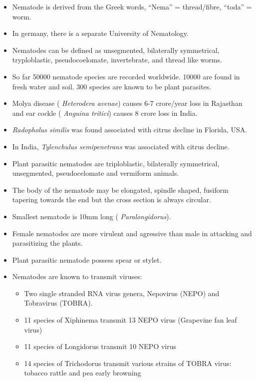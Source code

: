 \documentclass[
  openany]{book}
\providecommand{\tightlist}{%
  \setlength{\itemsep}{0pt}\setlength{\parskip}{0pt}}
\begin{document}
\begin{itemize}
\item
  Nematode is derived from the Greek words, ``Nema'' = thread/fibre, ``toda'' = worm.
\item
  In germany, there is a separate University of Nematology.
\item
  Nematodes can be defined as unsegmented, bilaterally symmetrical, tryploblastic, pseudocoelomate, invertebrate, and thread like worms.
\item
  So far 50000 nematode species are recorded worldwide. 10000 are found in fresh water and soil. 300 species are known to be plant parasites.
\item
  Molya disease ( \emph{Heterodera avenae}) causes 6-7 crore/year loss in Rajasthan and ear cockle ( \emph{Anguina tritici}) causes 8 crore loss in India.
\item
  \emph{Radopholus similis} was found associated with citrus decline in Florida, USA.
\item
  In India, \emph{Tylenchulus semipenetrans} was associated with citrus decline.
\item
  Plant parasitic nematodes are triploblastic, bilaterally symmetrical, unsegmented, pseudocelomate and vermiform animals.
\item
  The body of the nematode may be elongated, spindle shaped, fusiform tapering towards the end but the cross section is always circular.
\item
  Smallest nematode is 10mm long ( \emph{Paralongidorus}).
\item
  Female nematodes are more virulent and agressive than male in attacking and parasitizing the plants.
\item
  Plant parasitic nematode possess spear or stylet.
\item
  Nematodes are known to transmit viruses:

  \begin{itemize}
  \tightlist
  \item
    Two single stranded RNA virus genera, Nepovirus (NEPO) and Tobravirus (TOBRA).
  \item
    11 species of Xiphinema transmit 13 NEPO virus (Grapevine fan leaf virus)
  \item
    11 species of Longidorus transmit 10 NEPO virus
  \item
    14 species of Trichodorus transmit various strains of TOBRA virus: tobacco rattle and pea early browning
  \end{itemize}
\end{itemize}
\end{document}
